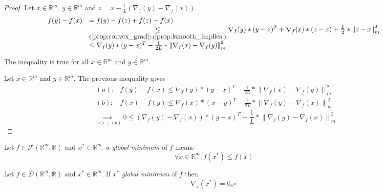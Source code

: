 \documentclass[11pt,en]{elegantpaper}
\newcommand{\norm}[1]{\left\lVert#1\right\rVert}
\newcommand{\Real}{\mathbb{R}}
\begin{document}
\begin{proof}
  Let $x \in \Real^m$, $y \in \Real^m$ and $z = x - \frac{1}{L}(\nabla_f(y) - \nabla_f(x))$.
  \begin{equation*}
    \begin{array}{ll}
      f(y) - f(x) & = f(y) - f(z) + f(z) - f(x) \\
      & \underset{(\ref{prop:convex_grad}),(\ref{prop:lsmooth_implies})}{\leq} \nabla_f(y) * (y - z)^T + \nabla_f(x) * (z - x) + \frac{L}{2} * \norm{z - x}_m^2 \\
      & \leq \nabla_f(y) * (y - x)^T - \frac{1}{2L} * \norm{\nabla_f(x) - \nabla_f(y)}^2_m
    \end{array}
  \end{equation*} \par
  The inequality is true for all $x \in \Real^m$ and $y \in \Real^m$.

  Let $x \in \Real^m$ and $y \in \Real^m$. The previous inequality gives \begin{equation*}
    \begin{array}{lll}
      (a) : & f(y) - f(x) \leq \nabla_f(y) * (y - x)^T - \frac{1}{2L} * \norm{\nabla_f(x) - \nabla_f(y)}^2_m \\
      (b) : & f(x) - f(y) \leq \nabla_f(x) * (x - y)^T - \frac{1}{2L} * \norm{\nabla_f(y) - \nabla_f(x)}^2_m
    \end{array}
  \end{equation*}
  \begin{equation*}
    \underset{(a) + (b)}{\implies} 0 \leq (\nabla_f(y) - \nabla_f(x)) * (y - x)^T - \frac{1}{L} * \norm{\nabla_f(y) - \nabla_f(x)}^2_m
  \end{equation*}
\end{proof}

\begin{definition}
  Let $f \in \mathcal{F}(\Real^m,\Real)$ and $x^* \in \Real^m$. $a$ \textit{global minimum} of $f$ means \begin{equation}\label{def:glob_min}
    \forall x \in \Real^m, f(x^*) \leq f(x)
  \end{equation}
\end{definition}

\begin{proposition}
  {\normalfont
    Let $f \in \mathcal{D}(\Real^m,\Real)$ and $x^* \in \Real^m$. If $x^*$ \textit{global minimum} of $f$ then \begin{equation}\label{prop:glob_min}
      \nabla_f(x^*) = 0_{\Real^m}
    \end{equation}
  }
\end{proposition}
\end{document}

